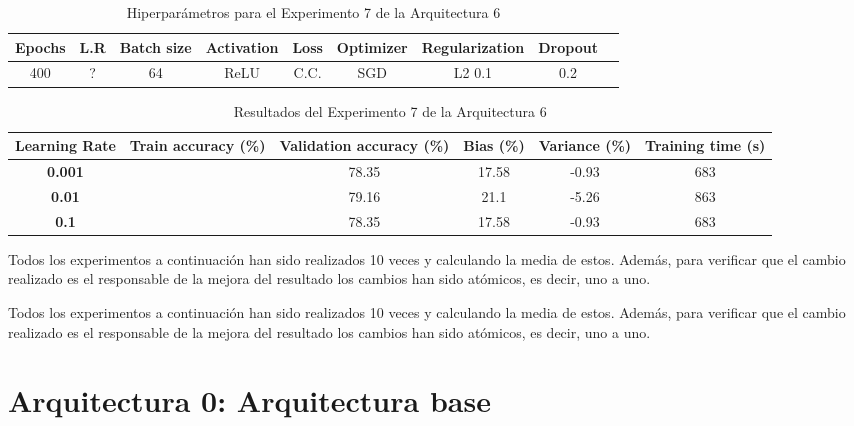 \documentclass{article}
\begin{document}
     \begin{table}[!h]
				\begin{tabular}{|c|c|c|c|c|c|c|c|c|}
					\textbf{Epochs}&\textbf{L.R}&\textbf{Batch size}&\textbf{Activation}&\textbf{Loss}&\textbf{Optimizer}&\textbf{Regularization}&\textbf{Dropout}   \\ \hline
					400 & ?  & 64 & ReLU & C.C. & SGD & L2 0.1 & 0.2 
				\end{tabular}
				\caption{Hiperpar\'ametros para el Experimento 7 de la Arquitectura 6}
				\label{tab:hip-a6-e2}
			\end{table}

    
   
   \begin{table}[!h]
				\begin{center}
					\begin{tabular}{ c | c | c | c | c | c |}
						 \textbf{Learning Rate} & \textbf{Train accuracy (\%)} & \textbf{Validation accuracy (\%)} & \textbf{Bias (\%)} & \textbf{Variance (\%)} & \textbf{Training time (s)} \\ \hline
	
                        \textbf{0.001} &    &  78.35& 17.58 & -0.93 &   683  \\ \hline
                        \textbf{0.01} &      & 79.16& 21.1 & -5.26 &   863  \\ \hline
                        \textbf{0.1} &   &  78.35& 17.58 & -0.93 &   683  \\ \hline
					\end{tabular}
					\caption{Resultados del Experimento 7 de la Arquitectura 6}
					\label{tab:res-a2-e5}
				\end{center}
			\end{table}
Todos los experimentos a continuaci\'on han sido realizados 10 veces y calculando la media de estos.
Adem\'as, para verificar que el cambio realizado es el responsable de la mejora del resultado los cambios han sido at\'omicos, es decir, uno a uno.

	Todos los experimentos a continuaci\'on han sido realizados 10 veces y calculando la media de estos.
Adem\'as, para verificar que el cambio realizado es el responsable de la mejora del resultado los cambios han sido at\'omicos, es decir, uno a uno.
	\section{Arquitectura 0: Arquitectura base}
\end{document}
